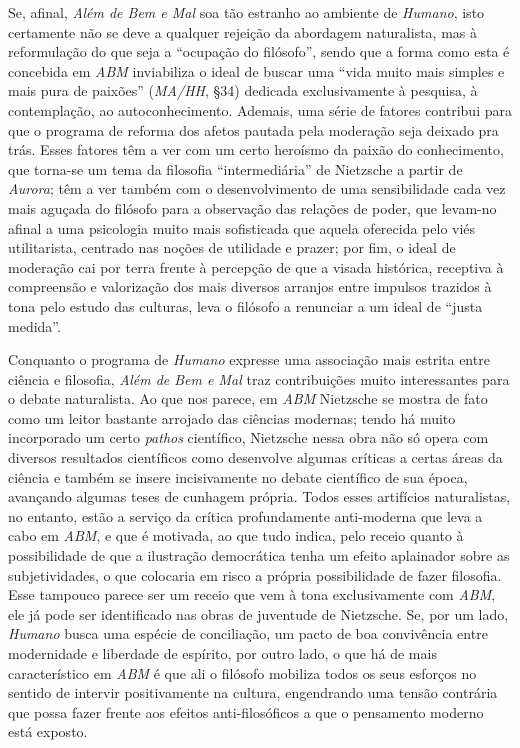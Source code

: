 \documentclass[
	12pt,				%
	openright,			%
	oneside,			%
	a4paper,			%
	english,			%
	french,				%
	spanish,			%
	brazil				%
	]{abntex2}
\begin{document}
Se, afinal, \textit{Além de Bem e Mal} soa tão estranho ao ambiente de \textit{Humano}, isto certamente não se deve a qualquer rejeição da abordagem naturalista, mas à reformulação do que seja a “ocupação do filósofo”, sendo que a forma como esta é concebida em \textit{ABM} inviabiliza o ideal de buscar uma “vida muito mais simples e mais pura de paixões” (\textit{MA/HH}, §34) dedicada exclusivamente à pesquisa, à contemplação, ao autoconhecimento. Ademais, uma série de fatores contribui para que o programa de reforma dos afetos pautada pela moderação seja deixado pra trás. Esses fatores têm a ver com um certo heroísmo da paixão do conhecimento, que torna-se um tema da filosofia “intermediária” de Nietzsche a partir de \textit{Aurora}; têm a ver também com o desenvolvimento de uma sensibilidade cada vez mais aguçada do filósofo para a observação das relações de poder, que levam-no afinal a uma psicologia muito mais sofisticada que aquela oferecida pelo viés utilitarista, centrado nas noções de utilidade e prazer; por fim, o ideal de moderação cai por terra frente à percepção de que a visada histórica, receptiva à compreensão e valorização dos mais diversos arranjos entre impulsos trazidos à tona pelo estudo das culturas, leva o filósofo a renunciar a um ideal de “justa medida”.

Conquanto o programa de \textit{Humano} expresse uma associação mais estrita entre ciência e filosofia, \textit{Além de Bem e Mal} traz contribuições muito interessantes para o debate naturalista. Ao que nos parece, em \textit{ABM} Nietzsche se mostra de fato como um leitor bastante arrojado das ciências modernas; tendo há muito incorporado um certo \textit{pathos} científico, Nietzsche nessa obra não só opera com diversos resultados científicos como desenvolve algumas críticas a certas áreas da ciência e também se insere incisivamente no debate científico de sua época, avançando algumas teses de cunhagem própria. Todos esses artifícios naturalistas, no entanto, estão a serviço da crítica profundamente anti-moderna que leva a cabo em \textit{ABM}, e que é motivada, ao que tudo indica, pelo receio quanto à possibilidade de que a ilustração democrática tenha um efeito aplainador sobre as subjetividades, o que colocaria em risco a própria possibilidade de fazer filosofia. Esse tampouco parece ser um receio que vem à tona exclusivamente com \textit{ABM}, ele já pode ser identificado nas obras de juventude de Nietzsche. Se, por um lado, \textit{Humano} busca uma espécie de conciliação, um pacto de boa convivência entre modernidade e liberdade de espírito, por outro lado, o que há de mais característico em \textit{ABM} é que ali o filósofo mobiliza todos os seus esforços no sentido de intervir positivamente na cultura, engendrando uma tensão contrária que possa fazer frente aos efeitos anti-filosóficos a que o pensamento moderno está exposto.
\end{document}
